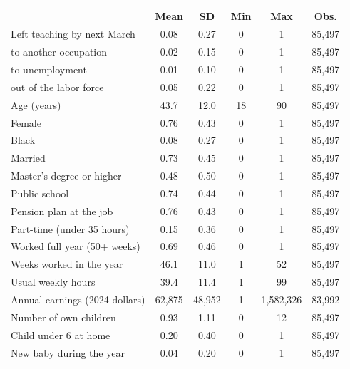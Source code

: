 \begin{tabular}{lccccc}
\toprule
 & Mean & SD & Min & Max & Obs. \\
\midrule
Left teaching by next March & 0.08 & 0.27 & 0 & 1 & 85,497 \\
\quad to another occupation & 0.02 & 0.15 & 0 & 1 & 85,497 \\
\quad to unemployment & 0.01 & 0.10 & 0 & 1 & 85,497 \\
\quad out of the labor force & 0.05 & 0.22 & 0 & 1 & 85,497 \\
\addlinespace
Age (years) & 43.7 & 12.0 & 18 & 90 & 85,497 \\
Female & 0.76 & 0.43 & 0 & 1 & 85,497 \\
Black & 0.08 & 0.27 & 0 & 1 & 85,497 \\
Married & 0.73 & 0.45 & 0 & 1 & 85,497 \\
Master's degree or higher & 0.48 & 0.50 & 0 & 1 & 85,497 \\
\addlinespace
Public school & 0.74 & 0.44 & 0 & 1 & 85,497 \\
Pension plan at the job & 0.76 & 0.43 & 0 & 1 & 85,497 \\
Part-time (under 35 hours) & 0.15 & 0.36 & 0 & 1 & 85,497 \\
Worked full year (50+ weeks) & 0.69 & 0.46 & 0 & 1 & 85,497 \\
Weeks worked in the year & 46.1 & 11.0 & 1 & 52 & 85,497 \\
Usual weekly hours & 39.4 & 11.4 & 1 & 99 & 85,497 \\
Annual earnings (2024 dollars) & 62,875 & 48,952 & 1 & 1,582,326 & 83,992 \\
\addlinespace
Number of own children & 0.93 & 1.11 & 0 & 12 & 85,497 \\
Child under 6 at home & 0.20 & 0.40 & 0 & 1 & 85,497 \\
New baby during the year & 0.04 & 0.20 & 0 & 1 & 85,497 \\
\bottomrule
\end{tabular}
